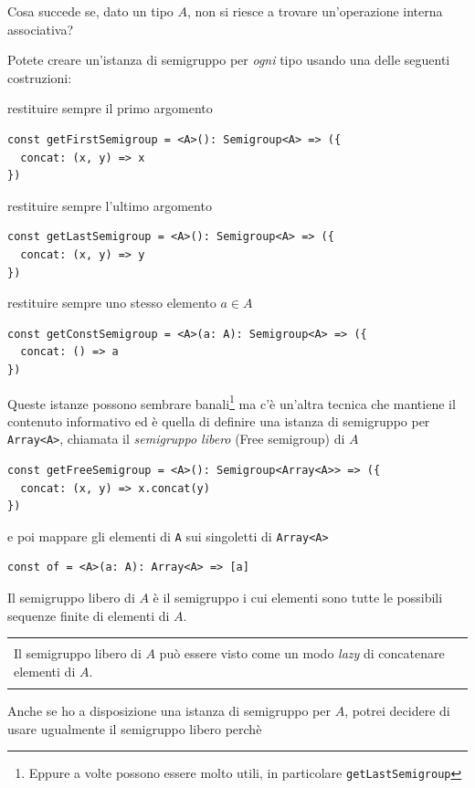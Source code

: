 \documentclass[12pt]{article}
\newenvironment{demo}
    {\begin{center}
    \begin{tabular}{|p{0.9\textwidth}|}
    \hline\\
    }
    {
    \\\\\hline
    \end{tabular}
    \end{center}
    }
\begin{document}
Cosa succede se, dato un tipo $A$, non si riesce a trovare un'operazione interna associativa?

Potete creare un'istanza di semigruppo per \emph{ogni} tipo usando una delle seguenti costruzioni:

restituire sempre il primo argomento

\begin{verbatim}
const getFirstSemigroup = <A>(): Semigroup<A> => ({
  concat: (x, y) => x
})
\end{verbatim}

restituire sempre l'ultimo argomento

\begin{verbatim}
const getLastSemigroup = <A>(): Semigroup<A> => ({
  concat: (x, y) => y
})
\end{verbatim}

restituire sempre uno stesso elemento $a \in A$

\begin{verbatim}
const getConstSemigroup = <A>(a: A): Semigroup<A> => ({
  concat: () => a
})
\end{verbatim}

Queste istanze possono sembrare banali\footnote{Eppure a volte possono essere molto utili, in particolare \texttt{getLastSemigroup}}
ma c'è un'altra tecnica che mantiene il contenuto informativo ed è quella di definire una istanza di semigruppo per \texttt{Array<A>},
chiamata il \emph{semigruppo libero} (Free semigroup) di $A$

\begin{verbatim}
const getFreeSemigroup = <A>(): Semigroup<Array<A>> => ({
  concat: (x, y) => x.concat(y)
})
\end{verbatim}

e poi mappare gli elementi di \texttt{A} sui singoletti di \texttt{Array<A>}

\begin{verbatim}
const of = <A>(a: A): Array<A> => [a]
\end{verbatim}

Il semigruppo libero di $A$ è il semigruppo i cui elementi sono tutte le possibili sequenze finite di elementi di $A$.

\begin{demo}
Il semigruppo libero di $A$ può essere visto come un modo \emph{lazy} di concatenare elementi di $A$.
\end{demo}

Anche se ho a disposizione una istanza di semigruppo per $A$, potrei decidere di usare ugualmente il semigruppo libero perchè
\end{document}
